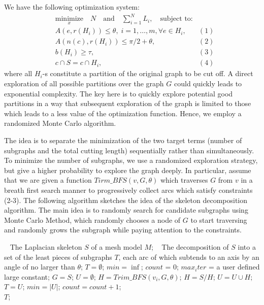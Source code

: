 We have the following optimization system:
\begin{equation*}
\begin{aligned}
& \underset{x}{\text{minimize}} \quad N \quad \text{and} \quad \sum_{i=1}^N{L_i},
\quad \text{subject to:} \\
& A(e, r(H_i)) \leq \theta, \; i = 1, \ldots, m, \forall e \in H_i, & (1)\\
& A(n(c), r(H_i)) \leq \pi/2+ \theta, & (2)\\
& b(H_i) \geq \tau, & (3)\\
& c \cap S = c \cap H_i, & (4)
\end{aligned}
\end{equation*}
where all $H_i$-s constitute a partition of the original graph to be cut off. A direct exploration of all possible partitions over the graph $G$ could quickly leads to exponential complexity. The key here is to quickly explore potential good partitions in a way that subsequent exploration of the graph is limited to those which leads to a less value of the optimization function. Hence, we employ a randomized Monte Carlo algorithm.

The idea is to separate the minimization of the two target terms (number of subgraphs and the total cutting length) sequentially rather than simultaneously. To minimize the number of subgraphs, we use a randomized exploration strategy, but give a higher probability to explore the graph deeply. In particular, assume that we are given a function $Tirm\_BFS(v, G, \theta)$ which traverses $G$ from $v$ in a breath first search manner to progressively collect arcs which satisfy constraints (2-3). The following algorithm sketches the idea of the skeleton decomposition algorithm. The main idea is to randomly search for candidate subgraphs using Monte Carlo Method, which randomly chooses a node of $G$ to start traversing and randomly grows the subgraph while paying attention to the constraints.

\begin{algorithm}
\caption{$SkeletonMeshDecomposition(S, M)$}
\label{alg:Framwork}
\begin{algorithmic}[1]
\REQUIRE~
The Laplacian skeleton $S$ of a mesh model $M$;
\ENSURE~
The decomposition of $S$ into a set of the least pieces of subgraphs $T$, each arc of which subtends to an axis by an angle of no larger than $\theta$;
\STATE $T = \emptyset$; $min = \inf$; $count$ = 0; $max_iter$ = a user defined large constant;
\STATE  $G=S$; $U= \emptyset$;
\STATE $H = Trim\_BFS(v_i, G, \theta)$;
\STATE $H = S / H$;
\STATE $U = U \cup H$;
\STATE $T = U$;
\STATE  $min = | U | $;
\ENDIF
\ENDFOR
\ENDWHILE
\STATE $count =count + 1$;
\ENDWHILE
\label{code:fram:select} \\
\RETURN $T$;
\end{algorithmic}
\end{algorithm}

